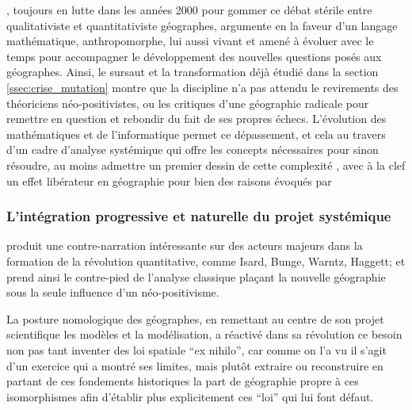\textcite{Sheppard2001}, toujours en lutte dans les années 2000 pour gommer ce débat stérile entre qualitativiste et quantitativiste géographes, argumente en la faveur d'un langage mathématique, anthropomorphe, lui aussi vivant et amené à évoluer avec le temps pour accompagner le développement des nouvelles questions posés aux géographes. Ainsi, le sursaut et la transformation déjà étudié dans la section \ref{ssec:crise_mutation} montre que la discipline n'a pas attendu le revirements des théoriciens néo-positivistes, ou les critiques d'une géographie radicale pour remettre en question et rebondir du fait de ses propres échecs. L'évolution des mathématiques et de l'informatique permet ce dépassement, et cela au travers d'un cadre d'analyse systémique qui offre les concepts nécessaires pour sinon résoudre, au moins admettre un premier dessin de cette complexité \autocite{Dauphine2003}, avec à la clef un effet libérateur en géographie pour bien des raisons évoqués par \textcite[27-28]{Pumain2003}



\subsubsection{L'intégration progressive et naturelle du projet systémique} 
\label{sssec:progressive_systemique}

\textcite{Barnes1996} produit une contre-narration intéressante sur des acteurs majeurs dans la formation de la révolution quantitative, comme Isard, Bunge, Warntz, Haggett; et prend ainsi le contre-pied de l'analyse classique plaçant la nouvelle géographie sous la seule influence d'un néo-positivisme. 

La posture nomologique des géographes, en remettant au centre de son projet scientifique les modèles et la modélisation, a réactivé dans sa révolution ce besoin non pas tant inventer des loi spatiale \foreignquote{latin}{ex nihilo}, car comme on l'a vu il s'agit d'un exercice qui a montré ses limites, mais plutôt extraire ou reconstruire en partant de ces fondements historiques la part de géographie propre à ces isomorphismes afin d'établir plus explicitement ces \enquote{loi} qui lui font défaut.

